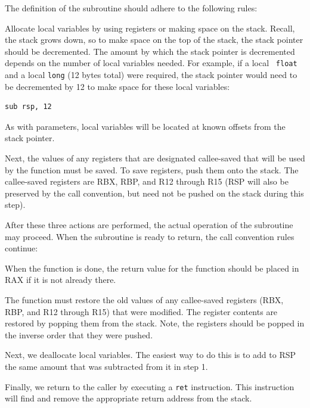 The definition of the subroutine should adhere to the following rules:

\begin{numlist}

\item Allocate local variables by using registers or making space on
  the stack.  Recall, the stack grows down, so to make space on the
  top of the stack, the stack pointer should be decremented. The
  amount by which the stack pointer is decremented depends on the
  number of local variables needed. For example, if a local {\tt
    float} and a local {\tt long} (12 bytes total) were required, the
  stack pointer would need to be decremented by 12 to make space for
  these local variables:

\begin{lstlisting}[backgroundcolor=\color{white},frame=trBL,linewidth=3.75in,xleftmargin=2.25in,label={x86-callee-code-2.lst},language={[x86masm]Assembler},caption={x86 callee code, part 2}]
sub rsp, 12
\end{lstlisting}

As with parameters, local variables will be located at known offsets
from the stack pointer.

\item Next, the values of any registers that are designated
  callee-saved that will be used by the function must be saved. To
  save registers, push them onto the stack. The callee-saved registers
  are RBX, RBP, and R12 through R15 (RSP will also be preserved by the
  call convention, but need not be pushed on the stack during this
  step).

  After these three actions are performed, the actual operation of the
  subroutine may proceed.  When the subroutine is ready to return, the
  call convention rules continue:

\item When the function is done, the return value for the function
  should be placed in RAX if it is not already there.

\item The function must restore the old values of any callee-saved
  registers (RBX, RBP, and R12 through R15) that were modified. The
  register contents are restored by popping them from the stack. Note,
  the registers should be popped in the inverse order that they were
  pushed.

\item Next, we deallocate local variables. The easiest way to do this
  is to add to RSP the same amount that was subtracted from it in step
  1.

\item Finally, we return to the caller by executing a {\tt ret}
  instruction. This instruction will find and remove the appropriate
  return address from the stack.

\end{numlist}

